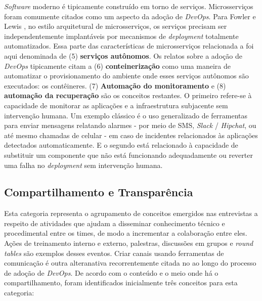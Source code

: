 {\it Software} moderno é tipicamente construído em torno de serviços.
Microsserviços foram comumente citados como um aspecto da adoção de {\it DevOps}.
Para Fowler e Lewis \cite{martinfowler2014microservices}, no estilo arquitetural
de microsserviços, os serviços precisam ser independentemente implantáveis por
mecanismos de {\it deployment} totalmente automatizados. Essa parte das
características de microsserviços relacionada a  foi aqui
denominada de (5) {\bf serviços autônomos}. Os relatos sobre a adoção de {\it DevOps}
tipicamente citam a (6) {\bf conteinerização} como uma maneira de automatizar o
provisionamento do ambiente onde esses serviços autônomos são executados: os
contêineres. (7) {\bf Automação do monitoramento} e (8) {\bf automação da
recuperação} são os conceitos restantes. O primeiro refere-se à capacidade de
monitorar as aplicações e a infraestrutura subjacente sem intervenção humana.
Um exemplo clássico é o uso generalizado de ferramentas para enviar mensagens
relatando alarmes - por meio de SMS, {\it Slack} / {\it Hipchat}, ou até mesmo
chamadas de celular - em caso de incidentes relacionados às aplicações
detectados automaticamente. E o segundo está relacionado à capacidade de
substituir um componente que não está funcionando adequadamente ou reverter uma
falha no {\it deployment} sem intervenção humana.

\subsection{Compartilhamento e Transparência}

Esta categoria representa o agrupamento de conceitos emergidos
nas entrevistas a respeito de atividades que ajudam a
disseminar conhecimento técnico e procedimental entre os times, de modo a incrementar a
colaboração entre eles. Ações de treinamento interno e externo, palestras,
discussões em grupos e {\it round tables} são exemplos desses eventos. Criar
canais usando ferramentas de comunicação é outra alteranativa recorrentemente
citada no  ao longo do processo de adoção de
{\it DevOps}. De acordo com o conteúdo e o meio onde há o compartilhamento,
foram identificados inicialmente três conceitos para esta categoria:

